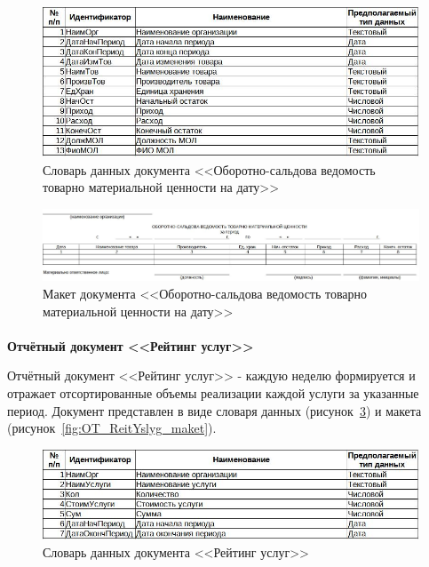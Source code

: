 \documentclass[12pt, a4paper, simple]{eskdtext}
\begin{document}
    \begin{figure}[!h]
        \centering
        \includegraphics[width=14cm]
            {_docs/ОТ_ОборСальдВед_типы.jpg}
        \caption{Словарь данных документа <<Оборотно-сальдова ведомость товарно материальной ценности на дату>>}
        \label{fig:OT_OborSaldVed_tipi}
    \end{figure}

    \begin{figure}[!h]
        \centering
        \includegraphics[width=14cm]
            {_docs/ОТ_ОборСальдВед_макет.jpg}
        \caption{Макет документа <<Оборотно-сальдова ведомость товарно материальной ценности на дату>>}
        \label{fig:OT_OborSaldVed_maket}
    \end{figure}

    \newpage
    \paragraph{} \textbf{Отчётный документ <<Рейтинг услуг>>}

    Отчётный документ <<Рейтинг услуг>>
    - каждую неделю формируется и отражает отсортированные объемы реализации каждой услуги за указанные период.
    Документ представлен в виде словаря данных (рисунок~\ref{fig:OT_ReitYslyg_tipi})
    и макета (рисунок~\ref{fig:OT_ReitYslyg_maket}).

    \begin{figure}[!h]
        \centering
        \includegraphics[width=14cm]
            {_docs/ОТ_РейтУслуг_типы.jpg}
        \caption{Словарь данных документа <<Рейтинг услуг>>}
        \label{fig:OT_ReitYslyg_tipi}
    \end{figure}
\end{document}
